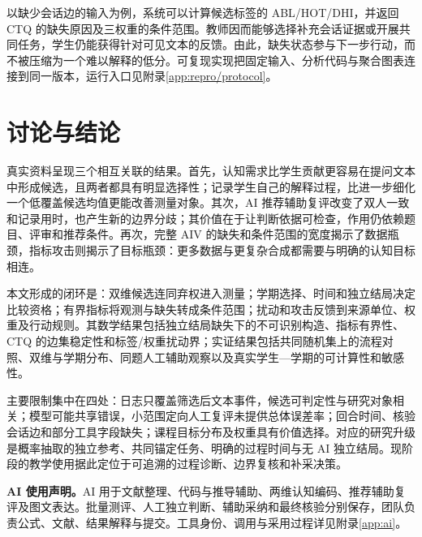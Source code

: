 \documentclass[withoutpreface,bwprint]{cumcmthesis}
\renewcommand{\thesubsection}{\arabic{section}.\arabic{subsection}}
\begin{document}
以缺少会话边的输入为例，系统可以计算候选标签的 ABL/HOT/DHI，并返回 CTQ 的缺失原因及三权重的条件范围。教师因而能够选择补充会话证据或开展共同任务，学生仍能获得针对可见文本的反馈。由此，缺失状态参与下一步行动，而不被压缩为一个难以解释的低分。可复现实现把固定输入、分析代码与聚合图表连接到同一版本，运行入口见附录\ref{app:repro/protocol}。

\section{讨论与结论}
真实资料呈现三个相互关联的结果。首先，认知需求比学生贡献更容易在提问文本中形成候选，且两者都具有明显选择性；记录学生自己的解释过程，比进一步细化一个低覆盖候选均值更能改善测量对象。其次，AI 推荐辅助复评改变了双人一致和记录用时，也产生新的边界分歧；其价值在于让判断依据可检查，作用仍依赖题目、评审和推荐条件。再次，完整 AIV 的缺失和条件范围的宽度揭示了数据瓶颈，指标攻击则揭示了目标瓶颈：更多数据与更复杂合成都需要与明确的认知目标相连。

本文形成的闭环是：双维候选连同弃权进入测量；学期选择、时间和独立结局决定比较资格；有界指标将观测与缺失转成条件范围；扰动和攻击反馈到来源单位、权重及行动规则。其数学结果包括独立结局缺失下的不可识别构造、指标有界性、CTQ 的边集稳定性和标签/权重扰动界；实证结果包括共同随机集上的流程对照、双维与学期分布、同题人工辅助观察以及真实学生—学期的可计算性和敏感性。

主要限制集中在四处：日志只覆盖筛选后文本事件，候选可判定性与研究对象相关；模型可能共享错误，小范围定向人工复评未提供总体误差率；回合时间、核验会话边和部分工具字段缺失；课程目标分布及权重具有价值选择。对应的研究升级是概率抽取的独立参考、共同锚定任务、明确的过程时间与无 AI 独立结局。现阶段的教学使用据此定位于可追溯的过程诊断、边界复核和补采决策。

\noindent\textbf{AI 使用声明。}AI 用于文献整理、代码与推导辅助、两维认知编码、推荐辅助复评及图文表达。批量测评、人工独立判断、辅助采纳和最终核验分别保存，团队负责公式、文献、结果解释与提交。工具身份、调用与采用过程详见附录\ref{app:ai}。

\begingroup
\linespread{1.15}\selectfont
{}
\printbibliography[title={参考文献}]
\endgroup
\clearpage
\appendix
{}
\renewcommand{\thepage}{附-\arabic{page}}
\renewcommand{\thesection}{\Alph{section}}
\renewcommand{\thesubsection}{\Alph{section}.\arabic{subsection}}
\titleformat{\section}{\centering\heiti\zihao{3}\bfseries}{附录\thesection}{0.8em}{}

\clearpage

\end{document}
